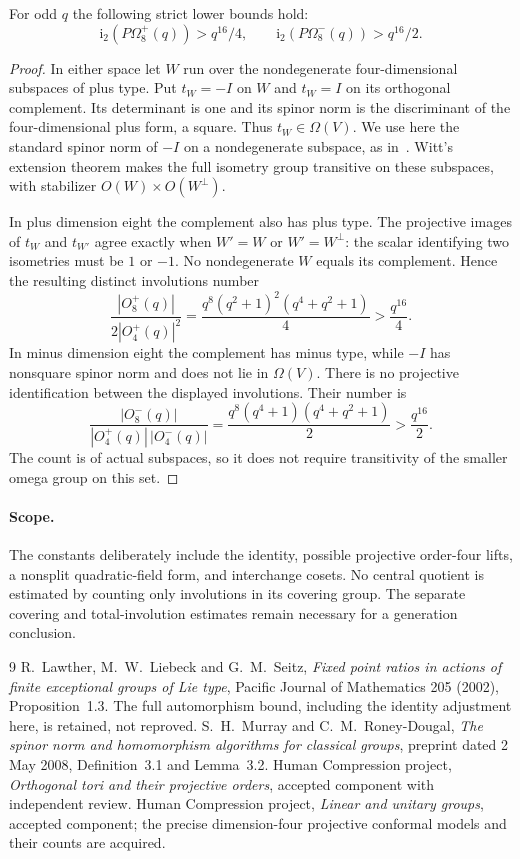 \documentclass[11pt,a4paper]{article}
\newcommand{\Om}{\Omega}
\begin{document}
\begin{proposition}\label{lower}
For odd $q$ the following strict lower bounds hold:
\[
 \mathrm i_2(P\Om_8^+(q))>q^{16}/4,
 \qquad \mathrm i_2(P\Om_8^-(q))>q^{16}/2.
\]
\end{proposition}
\begin{proof}
In either space let $W$ run over the nondegenerate four-dimensional
subspaces of plus type. Put $t_W=-I$ on $W$ and $t_W=I$ on its
orthogonal complement. Its determinant is one and its spinor norm is
the discriminant of the four-dimensional plus form, a square.
Thus $t_W\in\Om(V)$. We use here the standard spinor norm of $-I$
on a nondegenerate subspace, as in~\cite[Definition~3.1]{MRD}.
Witt's extension theorem makes the full isometry group transitive on
these subspaces, with stabilizer $O(W)\times O(W^\perp)$.

In plus dimension eight the complement also has plus type. The projective
images of $t_W$ and $t_{W'}$ agree exactly when $W'=W$ or $W'=W^\perp$:
the scalar identifying two isometries must be $1$ or $-1$.
No nondegenerate $W$ equals its complement. Hence the resulting distinct
involutions number
\[
 \frac{|O_8^+(q)|}{2|O_4^+(q)|^2}
 =\frac{q^8(q^2+1)^2(q^4+q^2+1)}4>\frac{q^{16}}4.
\]
In minus dimension eight the complement has minus type, while $-I$
has nonsquare spinor norm and does not lie in $\Om(V)$.
There is no projective identification between the displayed involutions.
Their number is
\[
 \frac{|O_8^-(q)|}{|O_4^+(q)|\,|O_4^-(q)|}
 =\frac{q^8(q^4+1)(q^4+q^2+1)}2>\frac{q^{16}}2.
\]
The count is of actual subspaces, so it does not require transitivity
of the smaller omega group on this set.
\end{proof}

\paragraph{Scope.}
The constants deliberately include the identity, possible projective
order-four lifts, a nonsplit quadratic-field form, and interchange
cosets. No central quotient is estimated by counting only involutions
in its covering group. The separate covering and total-involution
estimates remain necessary for a generation conclusion.

\begin{thebibliography}{9}\small
{} R.~Lawther, M.~W.~Liebeck and G.~M.~Seitz,
\emph{Fixed point ratios in actions of finite exceptional groups of Lie type},
Pacific Journal of Mathematics 205 (2002), Proposition~1.3.
The full automorphism bound, including the identity adjustment here,
is retained, not reproved.
 S.~H.~Murray and C.~M.~Roney-Dougal,
\emph{The spinor norm and homomorphism algorithms for classical groups},
preprint dated 2 May 2008, Definition~3.1 and Lemma~3.2.
 Human Compression project,
\emph{Orthogonal tori and their projective orders}, accepted component
with independent review.
 Human Compression project,
\emph{Linear and unitary groups}, accepted component; the precise
dimension-four projective conformal models and their counts are acquired.
\end{thebibliography}
\end{document}
